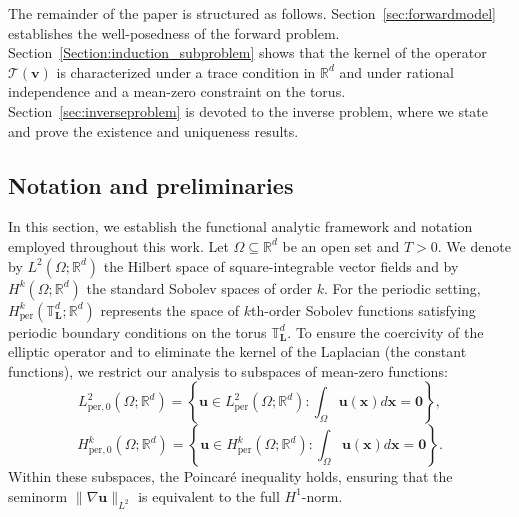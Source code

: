 \documentclass[12pt]{article}
\begin{document}
		The remainder of the paper is structured as follows. 
			Section~\ref{sec:forwardmodel} establishes the well-posedness of the forward problem. Section~\ref{Section:induction_subproblem} shows that the kernel of the operator $\mathcal{T}(\boldsymbol{v})$ is characterized under a trace condition in $\mathbb{R}^d$ and under rational independence and a mean-zero constraint on the torus. Section~\ref{sec:inverseproblem} is devoted to the inverse problem, where we state and prove the existence and uniqueness results. 
		

\subsection{Notation and preliminaries}In this section, we establish the functional analytic framework and notation employed throughout this work. Let $\Omega \subseteq \mathbb{R}^d$ be an open set and $T > 0$. We denote by $L^2(\Omega; \mathbb{R}^d)$ the Hilbert space of square-integrable vector fields and by $H^k(\Omega; \mathbb{R}^d)$ the standard Sobolev spaces of order $k$. For the periodic setting, $H^k_{\mathrm{per}}(\mathbb{T}^d_{\boldsymbol{L}}; \mathbb{R}^d)$ represents the space of $k$th-order Sobolev functions satisfying periodic boundary conditions on the torus $\mathbb{T}^d_{\boldsymbol{L}}$. To ensure the coercivity of the elliptic operator and to eliminate the kernel of the Laplacian (the constant functions), we restrict our analysis to subspaces of mean-zero functions:
\begin{equation}L^2_{\mathrm{per},0}(\Omega; \mathbb{R}^d) = \left\{ \boldsymbol{u} \in L^2_\mathrm{per}(\Omega; \mathbb{R}^d) : \int_{\Omega} \boldsymbol{u}(\boldsymbol{x})  d\boldsymbol{x} = \boldsymbol{0} \right\},\end{equation}
\begin{equation}H^k_{\mathrm{per},0}(\Omega; \mathbb{R}^d) = \left\{ \boldsymbol{u} \in H^k_\mathrm{per}(\Omega; \mathbb{R}^d) : \int_{\Omega} \boldsymbol{u}(\boldsymbol{x})  d\boldsymbol{x} = \boldsymbol{0} \right\}.\end{equation}
Within these subspaces, the Poincaré inequality holds, ensuring that the seminorm $\| \nabla \boldsymbol{u} \|_{L^2}$ is equivalent to the full $H^1$-norm.


\end{document}
